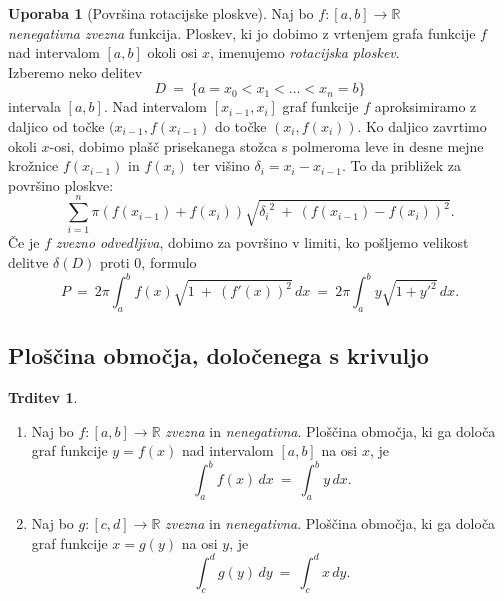 \documentclass[11pt]{article}
\newcommand{\R}{\mathbb{R}}
\theoremstyle{definition}
\theoremstyle{definition}
\newtheorem{trditev}{Trditev}[section]
\theoremstyle{definition}
\theoremstyle{theorem}
\newtheorem{uporaba}{Uporaba}[section]
\begin{document}
\begin{uporaba}[Površina rotacijske ploskve]

Naj bo $f:[a, b] \rightarrow \mathbb{R}$ \\\textit{nenegativna zvezna} funkcija. Ploskev, ki jo dobimo z vrtenjem grafa funkcije $f$ nad intervalom $[a, b]$ okoli osi $x$, imenujemo \textit{rotacijska ploskev}. \\

\noindent Izberemo neko delitev
$$D ~=~ \{a = x_0 < x_1 < \ldots < x_n = b\}$$
intervala $[a, b]$. Nad intervalom $[x_{i-1}, x_i]$ graf funkcije $f$ aproksimiramo z daljico od točke $(x_{i-1}, f(x_{i-1})$ do točke $(x_i, f(x_i))$. Ko daljico zavrtimo okoli $x$-osi, dobimo plašč prisekanega stožca s polmeroma leve in desne mejne krožnice $f(x_{i-1})$ in $f(x_i)$ ter višino $\delta_i = x_i - x_{i-1}$. To da približek za površino ploskve:
$$\sum_{i=1}^{n} \pi (f(x_{i-1}) + f(x_i)) \sqrt{{\delta_i}^2 ~+~ (f(x_{i-1}) - f(x_i))^2}.$$
Če je $f$ \textit{zvezno odvedljiva}, dobimo za površino v limiti, ko pošljemo velikost delitve $\delta(D)$ proti $0$, formulo
$$P ~=~ 2 \pi \int_{a}^{b} f(x) \sqrt{1 ~+~ (f'(x))^2}\,dx ~=~ 2 \pi \int_{a}^{b} y \sqrt{1 + {y'}^2}\,dx.$$

\end{uporaba}
\vspace{0.5cm}


\subsection{Ploščina območja, določenega s krivuljo}
\vspace{0.5cm}

\begin{trditev}
~
\begin{enumerate}
	\item Naj bo $f: [a, b] \rightarrow \R$ \textit{zvezna} in \textit{nenegativna}. Ploščina območja, ki ga določa graf funkcije $y = f(x)$ nad intervalom $[a, b]$ na osi $x$, je
	$$\int_a^b f(x)\,dx ~=~ \int_a^b y\,dx.$$
	
	\item Naj bo $g: [c, d] \rightarrow \R$ \textit{zvezna} in \textit{nenegativna}. Ploščina območja, ki ga določa graf funkcije $x = g(y)$ na osi $y$, je
	$$\int_c^d g(y)\,dy ~=~ \int_c^d x\,dy.$$
\end{enumerate}
\end{trditev}
\vspace{0.5cm}
\end{document}
